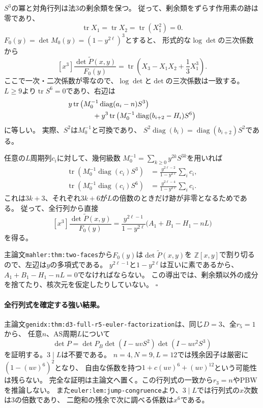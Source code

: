 \documentclass[11pt,a4paper]{ltjsarticle}
\begin{document}
$S^3$の冪と対角行列は法3の剰余類を保つ。
従って、剰余類をずらす作用素の跡は零であり、
\[
 \operatorname{tr}X_1=\operatorname{tr}X_2
 =\operatorname{tr}(X_1^2)=0.
\]
$F_0(y)=\det M_0(y)=(1-y^{2\ell})^3$とすると、
形式的な$\log\det$の三次係数から
\[
 [x^3]\frac{\det\widetilde P(x,y)}{F_0(y)}
 =\operatorname{tr}\left(X_3-X_1X_2+\frac13X_1^3\right).
\]
ここで一次・二次係数が零なので、$\log\det$と$\det$の三次係数は一致する。
$L\ge9$より$\operatorname{tr}S^6=0$であり、右辺は
\begin{align*}
 &y\operatorname{tr}\left(M_0^{-1}\operatorname{diag}(a_i-n)S^3\right)\\
 &\hspace{12mm}
 +y^3\operatorname{tr}\left(M_0^{-1}
                 \operatorname{diag}(b_{i+2}-H_i)S^6\right)
\end{align*}
に等しい。
実際、$S^2$は$M_0^{-1}$と可換であり、
$S^2\operatorname{diag}(b_i)=\operatorname{diag}(b_{i+2})S^2$である。

任意の$L$周期列$c_i$に対して、幾何級数
$M_0^{-1}=\sum_{k\ge0}y^{2k}S^{3k}$を用いれば
\begin{align*}
 \operatorname{tr}\left(M_0^{-1}\operatorname{diag}(c_i)S^3\right)
 &=\frac{y^{2\ell-2}}{1-y^{2\ell}}\sum_i c_i,\\
 \operatorname{tr}\left(M_0^{-1}\operatorname{diag}(c_i)S^6\right)
 &=\frac{y^{2\ell-4}}{1-y^{2\ell}}\sum_i c_i.
\end{align*}
これは$3k+3$、それぞれ$3k+6$が$L$の倍数のときだけ跡が非零となるためである。
従って、全行列から直接
\[
 [x^3]\frac{\det\widetilde P(x,y)}{F_0(y)}
 =\frac{y^{2\ell-1}}{1-y^{2\ell}}\bigl(A_1+B_1-H_1-nL\bigr)
\]
を得る。

主論文\texttt{mahler:thm:two-faces}から$F_0(y)$は$\det\widetilde P(x,y)$を
$\mathbb Z[x,y]$で割り切るので、左辺は$y$の多項式である。
$y^{2\ell-1}$と$1-y^{2\ell}$は互いに素であるから、
$A_1+B_1-H_1-nL=0$でなければならない。
この導出では、剰余類以外の成分を捨てたり、核次元を仮定したりしていない。
\hfill$\square$

\paragraph{全行列式を確定する強い結果。}
主論文\texttt{genidx:thm:d3-full-r5-euler-factorization}は、同じ$D=3$、全$r_5=1$から、
任意$n$、AS周期$L$について
\[
 \det P=\det P_B\det(I-uvS^2)\det(I-uv^2S^3)
\]
を証明する。$3\mid L$は不要である。
$n=4,N=9,L=12$では残余因子は厳密に$(1-(uv)^6)^2$となり、
自由な係数を持つ$1+c(uv)^6+(uv)^{12}$という可能性は残らない。
完全な証明は主論文へ置く。この行列式の一致から$r_3=n$やPBWを推論しない。
また\texttt{euler:lem:jump-congruence}より、$3\mid L$では行列式の$x$次数は3の倍数であり、
二飽和の残余で次に調べる係数は$x^6$である。
\end{document}

